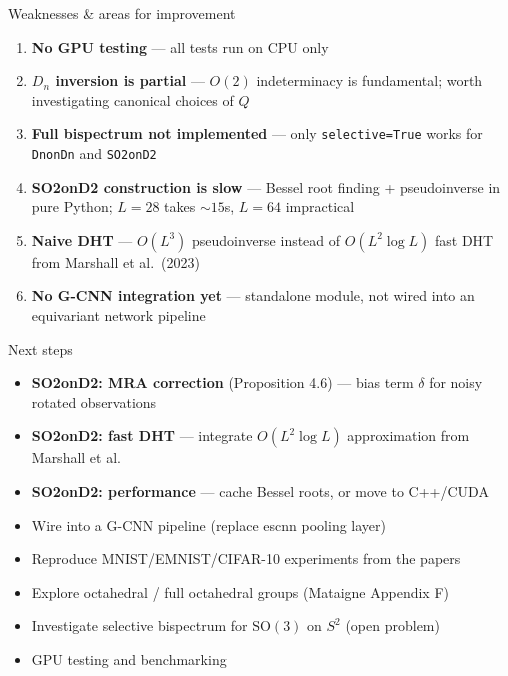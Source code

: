 \documentclass[aspectratio=169]{beamer}
\begin{document}
\begin{frame}{Weaknesses \& areas for improvement}
  \begin{enumerate}
    \item \textbf{No GPU testing} --- all tests run on CPU only

    \item \textbf{$D_n$ inversion is partial} --- $O(2)$ indeterminacy is fundamental;
      worth investigating canonical choices of $Q$

    \item \textbf{Full bispectrum not implemented} --- only \texttt{selective=True}
      works for \texttt{DnonDn} and \texttt{SO2onD2}

    \item \textbf{SO2onD2 construction is slow} --- Bessel root finding + pseudoinverse
      in pure Python; $L=28$ takes ${\sim}15$s, $L=64$ impractical

    \item \textbf{Naive DHT} --- $O(L^3)$ pseudoinverse instead of
      $O(L^2 \log L)$ fast DHT from Marshall et al.\ (2023)

    \item \textbf{No G-CNN integration yet} --- standalone module,
      not wired into an equivariant network pipeline
  \end{enumerate}
\end{frame}

\begin{frame}{Next steps}
  \begin{itemize}
    \item \textbf{SO2onD2: MRA correction} (Proposition 4.6) --- bias term $\delta$ for noisy rotated observations
    \item \textbf{SO2onD2: fast DHT} --- integrate $O(L^2 \log L)$ approximation from Marshall et al.
    \item \textbf{SO2onD2: performance} --- cache Bessel roots, or move to C++/CUDA
    \item Wire into a G-CNN pipeline (replace escnn pooling layer)
    \item Reproduce MNIST/EMNIST/CIFAR-10 experiments from the papers
    \item Explore octahedral / full octahedral groups (Mataigne Appendix F)
    \item Investigate selective bispectrum for $\mathrm{SO}(3)$ on $S^2$ (open problem)
    \item GPU testing and benchmarking
  \end{itemize}
\end{frame}
\end{document}
